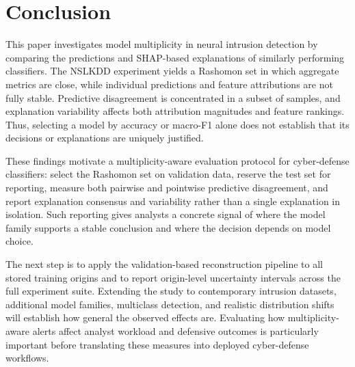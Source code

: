 \section{Conclusion}

This paper investigates model multiplicity in neural intrusion detection by comparing the predictions and \gls{SHAP}-based explanations of similarly performing classifiers. The \gls{NSLKDD} experiment yields a Rashomon set in which aggregate metrics are close, while individual predictions and feature attributions are not fully stable. Predictive disagreement is concentrated in a subset of samples, and explanation variability affects both attribution magnitudes and feature rankings. Thus, selecting a model by accuracy or macro-\gls{F1} alone does not establish that its decisions or explanations are uniquely justified.

These findings motivate a multiplicity-aware evaluation protocol for cyber-defense classifiers: select the Rashomon set on validation data, reserve the test set for reporting, measure both pairwise and pointwise predictive disagreement, and report explanation consensus and variability rather than a single explanation in isolation. Such reporting gives analysts a concrete signal of where the model family supports a stable conclusion and where the decision depends on model choice.

The next step is to apply the validation-based reconstruction pipeline to all stored training origins and to report origin-level uncertainty intervals across the full experiment suite. Extending the study to contemporary intrusion datasets, additional model families, multiclass detection, and realistic distribution shifts will establish how general the observed effects are. Evaluating how multiplicity-aware alerts affect analyst workload and defensive outcomes is particularly important before translating these measures into deployed cyber-defense workflows.


